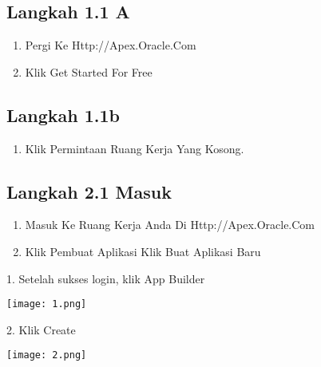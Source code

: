 \documentclass{article}
\begin{document}
\usepackage{Spreadsheet: Memungkinkan Pengguna Untuk Menyimpan Berbagai Informasi Yang Sangat Lengkap, Pada Setiap Kolomnya Bisa Menyimpan Berbagai Data Informasi Yang Berbeda Dari Informasi Yang Di Perlukan. App From Spreadsheet Disini Berupa Beberapa Project Dan Nama Tugas Nya Serta Keterangan Lainnya Seperti Tanggal Mulai, Tanggal Selesai, Status, Di Ttd Oleh,Biaya, Budget Tersedia, Dan Lebih Kurangnya Dari Budget.}

\subsection{Langkah 1.1 A}
\begin{enumerate}
    \item Pergi Ke Http://Apex.Oracle.Com
    \item Klik Get Started For Free
    \end{enumerate}
\subsection{Langkah 1.1b}
\begin{enumerate}
    \item Klik Permintaan Ruang Kerja Yang Kosong.
    \end{enumerate}
\subsection{Langkah 2.1 Masuk}
\begin{enumerate}
    \item Masuk Ke Ruang Kerja Anda Di Http://Apex.Oracle.Com
    \item Klik Pembuat Aplikasi Klik Buat Aplikasi Baru
    \end{enumerate}


    \item 1.  Setelah sukses login, klik App Builder

\begin{center}
    \texttt{[image: 1.png]}
    \end{center}
    
    \item 2. Klik Create

\begin{center}
    \texttt{[image: 2.png]}
    \end{center}
    
\end{document}
